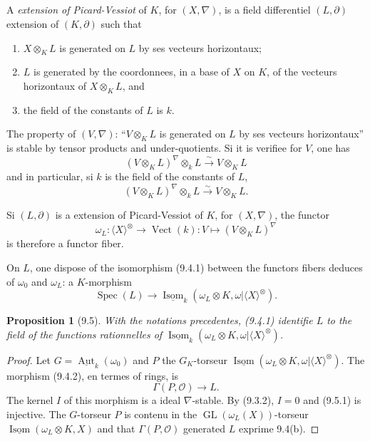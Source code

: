 \documentclass[12pt,a4paper]{article}
\theoremstyle{plain}
\newtheorem{proposition}[theorem]{Proposition}
\theoremstyle{definition}
\DeclareMathOperator{\Spec}{Spec}
\DeclareMathOperator{\Aut}{Aut}
\DeclareMathOperator{\Isom}{Isom}
\DeclareMathOperator{\Vect}{Vect}
\DeclareMathOperator{\GL}{GL}
\begin{document}
\subsection{}

A \emph{extension of Picard-Vessiot} of $K$, for $(X, \nabla)$, is a field differentiel $(L, \partial)$ extension of $(K, \partial)$ such that
\begin{enumerate}
\item[(a)] $X \otimes_K L$ is generated on $L$ by ses vecteurs horizontaux;
\item[(b)] $L$ is generated by the coordonnees, in a base of $X$ on $K$, of the vecteurs horizontaux of $X \otimes_K L$, and
\item[(c)] the field of the constants of $L$ is $k$.
\end{enumerate}

The property of $(V, \nabla)$: ``$V \otimes_K L$ is generated on $L$ by ses vecteurs horizontaux'' is stable by tensor products and under-quotients. Si it is verifiee for $V$, one has
\[
(V \otimes_K L)^\nabla \otimes_k L \xrightarrow{\sim} V \otimes_K L
\]
and in particular, si $k$ is the field of the constants of $L$,
\[
(V \otimes_K L)^\nabla \otimes_k L \xrightarrow{\sim} V \otimes_K L.
\]

Si $(L, \partial)$ is a extension of Picard-Vessiot of $K$, for $(X, \nabla)$, the functor
\[
\omega_L : \langle X \rangle^\otimes \to \Vect(k) : V \mapsto (V \otimes_K L)^\nabla
\]
is therefore a functor fiber.

On $L$, one dispose of the isomorphism (9.4.1) between the functors fibers deduces of $\omega_0$ and $\omega_L$: a $K$-morphism
\begin{equation}\label{eq:9.4.2}
\Spec(L) \to \underline{\Isom}_k(\omega_L \otimes K, \omega | \langle X \rangle^\otimes).
\end{equation}

\begin{proposition}[9.5]
With the notations precedentes, (9.4.1) identifie $L$ to the field of the functions rationnelles of $\underline{\Isom}_k(\omega_L \otimes K, \omega | \langle X \rangle^\otimes)$.
\end{proposition}

\begin{proof}
Let $G = \underline{\Aut}_k(\omega_0)$ and $P$ the $G_K$-torseur $\underline{\Isom}(\omega_L \otimes K, \omega | \langle X \rangle^\otimes)$. The morphism (9.4.2), en termes of rings, is
\begin{equation}\label{eq:9.5.1}
\Gamma(P, \mathcal{O}) \to L.
\end{equation}
The kernel $I$ of this morphism is a ideal $\nabla$-stable. By (9.3.2), $I = 0$ and (9.5.1) is injective. The $G$-torseur $P$ is contenu in the $\GL(\omega_L(X))$-torseur $\underline{\Isom}(\omega_L \otimes K, X)$ and that $\Gamma(P, \mathcal{O})$ generated $L$ exprime 9.4(b).
\end{proof}
\end{document}
